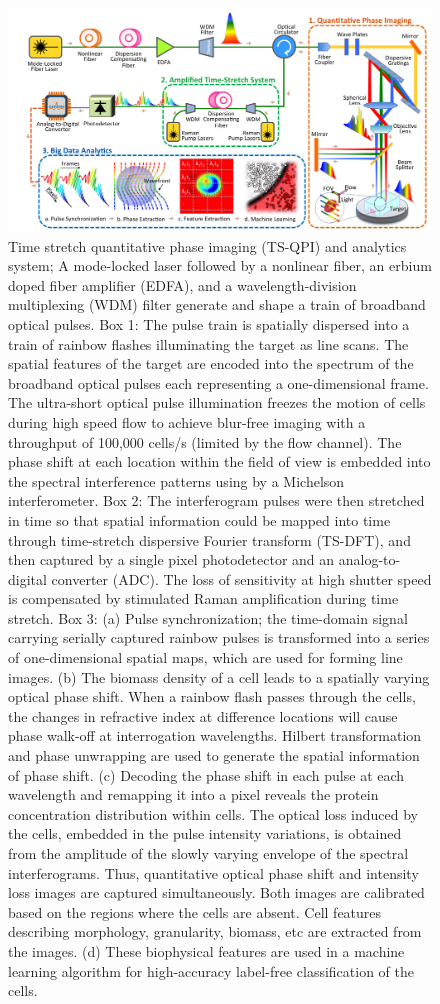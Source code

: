 \documentclass[aps,pra,reprint,superscriptaddress]{revtex4-1}
\begin{document}
\begin{figure}
\includegraphics[scale=0.2]{FigureSetup.jpg}
\caption{\label{fig:Setup} Time stretch quantitative phase imaging (TS-QPI) and analytics system; A mode-locked laser followed by a nonlinear fiber, an erbium doped fiber amplifier (EDFA), and a wavelength-division multiplexing (WDM) filter generate and shape a train of broadband optical pulses. Box 1: The pulse train is spatially dispersed into a train of rainbow flashes illuminating the target as line scans. The spatial features of the target are encoded into the spectrum of the broadband optical pulses each representing a one-dimensional frame. The ultra-short optical pulse illumination freezes the motion of cells during high speed flow to achieve blur-free imaging with a throughput of 100,000 cells/s (limited by the flow channel). The phase shift at each location within the field of view is embedded into the spectral interference patterns using by a Michelson interferometer. Box 2: The interferogram pulses were then stretched in time so that spatial information could be mapped into time through time-stretch dispersive Fourier transform (TS-DFT), and then captured by a single pixel photodetector and an analog-to-digital converter (ADC). The loss of sensitivity at high shutter speed is compensated by stimulated Raman amplification during time stretch. Box 3: (a) Pulse synchronization; the time-domain signal carrying serially captured rainbow pulses is transformed into a series of one-dimensional spatial maps, which are used for forming line images. (b) The biomass density of a cell leads to a spatially varying optical phase shift. When a rainbow flash passes through the cells, the changes in refractive index at difference locations will cause phase walk-off at interrogation wavelengths. Hilbert transformation and phase unwrapping are used to generate the spatial information of phase shift. (c) Decoding the phase shift in each pulse at each wavelength and remapping it into a pixel reveals the protein concentration distribution within cells. The optical loss induced by the cells, embedded in the pulse intensity variations, is obtained from the amplitude of the slowly varying envelope of the spectral interferograms. Thus, quantitative optical phase shift and intensity loss images are captured simultaneously. Both images are calibrated based on the regions where the cells are absent. Cell features describing morphology, granularity, biomass, etc are extracted from the images. (d) These biophysical features are used in a machine learning algorithm for high-accuracy label-free classification of the cells.}

\end{figure}
\end{document}
